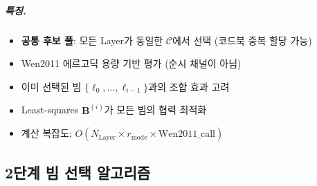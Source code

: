 \documentclass[10pt]{article}
\begin{document}
\subparagraph{특징.}
\begin{itemize}
    \item \textbf{공통 후보 풀}: 모든 Layer가 동일한 $\mathcal{C}$에서 선택 (코드북 중복 할당 가능)
    \item Wen2011 에르고딕 용량 기반 평가 (순시 채널이 아님)
    \item 이미 선택된 빔 $\{\ell_0, \ldots, \ell_{i-1}\}$과의 조합 효과 고려
    \item Least-squares $\mathbf{B}^{(i)}$가 모든 빔의 협력 최적화
    \item 계산 복잡도: $O(N_{\text{Layer}} \times r_{\text{mode}} \times \text{Wen2011\_call})$
\end{itemize}

\subsection{2단계 빔 선택 알고리즘}
\end{document}
